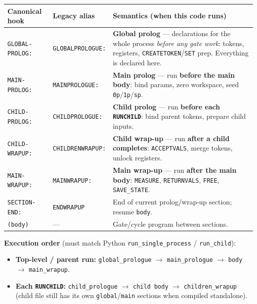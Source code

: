 \documentclass[11pt,a4paper]{article}
\begin{document}
\begin{center}
\small
\begin{tabular}{@{}p{3.2cm}p{3.2cm}p{8.2cm}@{}}
\toprule
Canonical hook & Legacy alias & Semantics (when this code runs) \\
\midrule
\texttt{GLOBAL-PROLOG:} & \texttt{GLOBALPROLOGUE:} &
\textbf{Global prolog} --- declarations for the whole process \emph{before any gate work}: tokens, registers, \texttt{CREATETOKEN}/\texttt{SET} prep. Everything is declared here. \\
\texttt{MAIN-PROLOG:} & \texttt{MAINPROLOGUE:} &
\textbf{Main prolog} --- run \textbf{before the main body}: bind params, zero workspace, seed \texttt{0p}/\texttt{1p}/\texttt{sp}. \\
\texttt{CHILD-PROLOG:} & \texttt{CHILDPROLOGUE:} &
\textbf{Child prolog} --- run \textbf{before each \texttt{RUNCHILD}}: bind parent tokens, prepare child inputs. \\
\texttt{CHILD-WRAPUP:} & \texttt{CHILDRENWRAPUP:} &
\textbf{Child wrap-up} --- run \textbf{after a child completes}: \texttt{ACCEPTVALS}, merge tokens, unlock registers. \\
\texttt{MAIN-WRAPUP:} & \texttt{MAINWRAPUP:} &
\textbf{Main wrap-up} --- run \textbf{after the main body}: \texttt{MEASURE}, \texttt{RETURNVALS}, \texttt{FREE}, \texttt{SAVE\_STATE}. \\
\texttt{SECTION-END:} & \texttt{ENDWRAPUP} &
End of current prolog/wrap-up section; resume \texttt{body}. \\
\texttt{(body)} & --- &
Gate/cycle program between sections. \\
\bottomrule
\end{tabular}
\end{center}

\textbf{Execution order} (must match Python \texttt{run\_single\_process} / \texttt{run\_child}):
\begin{itemize}[noitemsep]
  \item \textbf{Top-level / parent run:}
    \texttt{global\_prologue} $\rightarrow$ \texttt{main\_prologue} $\rightarrow$ \texttt{body} $\rightarrow$ \texttt{main\_wrapup}.
  \item \textbf{Each \texttt{RUNCHILD}:}
    \texttt{child\_prologue} $\rightarrow$ \texttt{child body} $\rightarrow$ \texttt{children\_wrapup}
    (child file still has its own \texttt{global}/\texttt{main} sections when compiled standalone).
\end{itemize}
\end{document}
